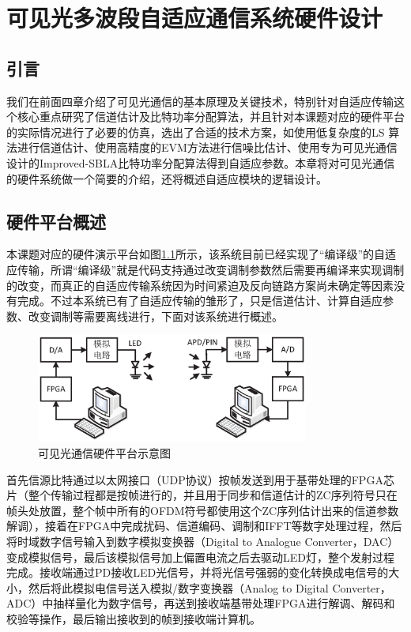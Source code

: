 \chapter{可见光多波段自适应通信系统硬件设计}
\section{引言}
我们在前面四章介绍了可见光通信的基本原理及关键技术，特别针对自适应传输这个核心重点研究了信道估计及比特功率分配算法，并且针对本课题对应的硬件平台的实际情况进行了必要的仿真，选出了合适的技术方案，如使用低复杂度的LS 算法进行信道估计、使用高精度的EVM方法进行信噪比估计、使用专为可见光通信设计的Improved-SBLA比特功率分配算法得到自适应参数。本章将对可见光通信的硬件系统做一个简要的介绍，还将概述自适应模块的逻辑设计。
\section{硬件平台概述}
本课题对应的硬件演示平台如图\ref{fig:Hardware_Structure}所示，该系统目前已经实现了“编译级”的自适应传输，所谓“编译级”就是代码支持通过改变调制参数然后需要再编译来实现调制的改变，而真正的自适应传输系统因为时间紧迫及反向链路方案尚未确定等因素没有完成。不过本系统已有了自适应传输的雏形了，只是信道估计、计算自适应参数、改变调制等需要离线进行，下面对该系统进行概述。
\begin{figure}[htbp]
\centering
\includegraphics[width=0.8\textwidth]{figures/chapter-5/Hardware_Structure.eps}
\caption{可见光通信硬件平台示意图}
\label{fig:Hardware_Structure}
\end{figure}

首先信源比特通过以太网接口（UDP协议）按帧发送到用于基带处理的FPGA芯片（整个传输过程都是按帧进行的，并且用于同步和信道估计的ZC序列符号只在帧头处放置，整个帧中所有的OFDM符号都使用这个ZC序列估计出来的信道参数解调），接着在FPGA中完成扰码、信道编码、调制和IFFT等数字处理过程，然后将时域数字信号输入到数字模拟变换器（Digital to Analogue Converter，DAC）变成模拟信号，最后该模拟信号加上偏置电流之后去驱动LED灯，整个发射过程完成。接收端通过PD接收LED光信号，并将光信号强弱的变化转换成电信号的大小，然后将此模拟电信号送入模拟/数字变换器（Analog to Digital Converter，ADC）中抽样量化为数字信号，再送到接收端基带处理FPGA进行解调、解码和校验等操作，最后输出接收到的帧到接收端计算机。
